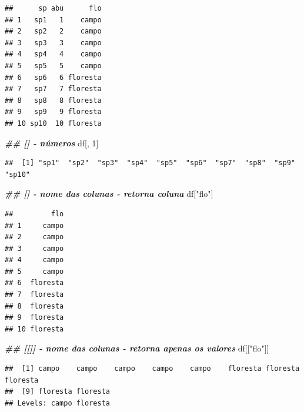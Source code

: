 \documentclass[
]{article}
\newenvironment{Shaded}{\begin{snugshade}}{\end{snugshade}}
\newcommand{\DecValTok}[1]{\textcolor[rgb]{0.00,0.00,0.81}{#1}}
\newcommand{\DocumentationTok}[1]{\textcolor[rgb]{0.56,0.35,0.01}{\textbf{\textit{#1}}}}
\newcommand{\NormalTok}[1]{#1}
\newcommand{\SpecialCharTok}[1]{\textcolor[rgb]{0.81,0.36,0.00}{\textbf{#1}}}
\newcommand{\StringTok}[1]{\textcolor[rgb]{0.31,0.60,0.02}{#1}}
\begin{document}
\begin{verbatim}
##      sp abu      flo
## 1   sp1   1    campo
## 2   sp2   2    campo
## 3   sp3   3    campo
## 4   sp4   4    campo
## 5   sp5   5    campo
## 6   sp6   6 floresta
## 7   sp7   7 floresta
## 8   sp8   8 floresta
## 9   sp9   9 floresta
## 10 sp10  10 floresta
\end{verbatim}

\begin{Shaded}
\begin{Highlighting}[]
\DocumentationTok{\#\# [] {-} números}
\NormalTok{df[, }\DecValTok{1}\NormalTok{]}
\end{Highlighting}
\end{Shaded}

\begin{verbatim}
##  [1] "sp1"  "sp2"  "sp3"  "sp4"  "sp5"  "sp6"  "sp7"  "sp8"  "sp9"  "sp10"
\end{verbatim}

\begin{Shaded}
\begin{Highlighting}[]
\DocumentationTok{\#\# [] {-} nome das colunas {-} retorna coluna}
\NormalTok{df[}\StringTok{"flo"}\NormalTok{]}
\end{Highlighting}
\end{Shaded}

\begin{verbatim}
##         flo
## 1     campo
## 2     campo
## 3     campo
## 4     campo
## 5     campo
## 6  floresta
## 7  floresta
## 8  floresta
## 9  floresta
## 10 floresta
\end{verbatim}

\begin{Shaded}
\begin{Highlighting}[]
\DocumentationTok{\#\# [[]] {-} nome das colunas {-} retorna apenas os valores}
\NormalTok{df[[}\StringTok{"flo"}\NormalTok{]]}
\end{Highlighting}
\end{Shaded}

\begin{verbatim}
##  [1] campo    campo    campo    campo    campo    floresta floresta floresta
##  [9] floresta floresta
## Levels: campo floresta
\end{verbatim}

\begin{Shaded}
\end{Shaded}
\end{document}
